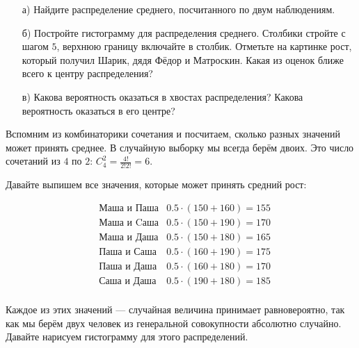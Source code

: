 \documentclass[12pt, a4paper, oneside]{article}
\begin{document}
\begin{enumerate} 
	\item[а)] Найдите распределение среднего, посчитанного по двум наблюдениям. 
	\item[б)]  Постройте гистограмму для распределения среднего. Столбики стройте с шагом $5$, верхнюю границу включайте в столбик. Отметьте на картинке рост, который получил Шарик, дядя Фёдор и Матроскин. Какая из оценок ближе всего к центру распределения? 
	\item[в)] Какова вероятность оказаться в хвостах распределения? Какова вероятность оказаться в его центре? 
\end{enumerate} 

\begin{sol}
Вспомним из комбинаторики сочетания и посчитаем, сколько разных значений может принять среднее. В случайную выборку мы всегда берём двоих. Это число сочетаний из $4$ по $2$:  $C_4^2 = \frac{4!}{2!2!} =  6$.

Давайте выпишем все значения, которые может принять средний рост: 

\begin{equation*}
\begin{aligned}
& \text{Маша и Паша}  & 0.5 \cdot (150 + 160) = 155 \\
& \text{Маша и Cаша}  & 0.5 \cdot (150 + 190) = 170 \\
& \text{Маша и Даша}  & 0.5 \cdot (150 + 180) = 165 \\
& \text{Паша и Саша}  & 0.5 \cdot (160 + 190) = 175 \\
& \text{Паша и Даша}  & 0.5 \cdot (160 + 180) =  170 \\
& \text{Саша и Даша}  & 0.5 \cdot (190 + 180) =  185 \\
\end{aligned} 
\end{equation*}

Каждое из этих значений --- случайная величина принимает равновероятно, так как мы берём двух человек из генеральной совокупности абсолютно случайно.  Давайте нарисуем гистограмму для этого распределений. 


\end{sol}
\end{document}
